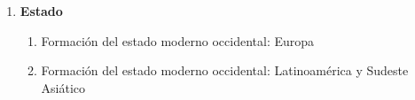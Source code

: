 \documentclass[letterpaper]{article}
\begin{document}
\begin{enumerate}
\begin{enumerate}
				\item Clientelismo %
				\item Parlamentarismo y presidencialismo: %
				\item ¿Qu\'e es el autoritarismo? %
				\item ¿Y qu\'e importa? %
			\end{enumerate}
	\item {\bf Estado}
		\begin{enumerate}
			\item Formaci\'on del estado moderno occidental: Europa %
			\item Formaci\'on del estado moderno occidental: Latinoam\'erica y Sudeste Asi\'atico %
		\end{enumerate}



\end{enumerate}



			


			



\newpage
{}
\setcounter{page}{1}
\printbibliography
\end{document}
